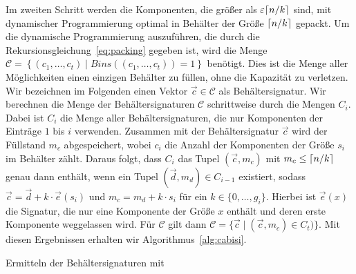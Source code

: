Im zweiten Schritt werden die Komponenten, die größer als $\varepsilon \lceil n/k\rceil$ sind, mit dynamischer Programmierung optimal in Behälter der Größe $\lceil n/k\rceil$ gepackt.
Um die dynamische Programmierung auszuführen, die durch die Rekursionsgleichung~\eqref{eq:packing} gegeben ist, wird die Menge $\mathcal{C} = \left\{ (c_1, \ldots, c_t) \mid Bins((c_1, \ldots, c_t)) = 1 \right\}$ benötigt.
Dies ist die Menge aller Möglichkeiten einen einzigen Behälter zu füllen, ohne die Kapazität zu verletzen.
Wir bezeichnen im Folgenden einen Vektor $\vec{c} \in \mathcal{C}$ als Behältersignatur.
Wir berechnen die Menge der Behältersignaturen $\mathcal{C}$ schrittweise durch die Mengen $C_i$.
Dabei ist $C_i$ die Menge aller Behältersignaturen, die nur Komponenten der Einträge $1$ bis $i$ verwenden.
Zusammen mit der Behältersignatur $\vec{c}$ wird der Füllstand $m_c$ abgespeichert, wobei $c_i$ die Anzahl der Komponenten der Größe $s_i$ im Behälter zählt.
Daraus folgt, dass $C_i$ das Tupel $(\vec{c}, m_c)$ mit $m_c \leq \lceil n/k\rceil$ genau dann enthält, wenn ein Tupel $(\vec{d}, m_d) \in C_{i-1}$ existiert, sodass $\vec{c} = \vec{d} + k \cdot \vec{e}(s_i)$ und $m_c = m_d + k \cdot s_i$ für ein $k \in \{0, \ldots, g_i\}$.
Hierbei ist $\vec{e}(x)$ die Signatur, die nur eine Komponente der Größe $x$ enthält und deren erste Komponente weggelassen wird.
Für $\mathcal{C}$ gilt dann $\mathcal{C} = \{ \vec{c} \mid (\vec{c}, m_c) \in C_t)\}$.
Mit diesen Ergebnissen erhalten wir Algorithmus~\ref{alg:cabisi}.

\begin{algorithm}
    \caption{Ermitteln der Behältersignaturen mit }
    \label{alg:cabisi}
    \begin{algorithmic}[1]
                       \EndIf
                    \EndFor
                \EndFor
            \EndFor
        \EndFunction
    \end{algorithmic}
\end{algorithm}


